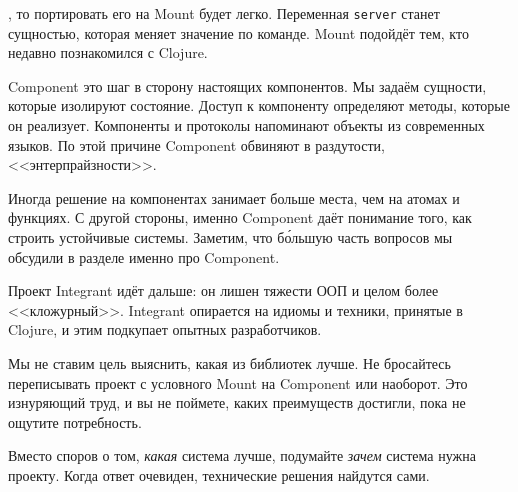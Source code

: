 \noindent
, то портировать его на Mount будет легко. Переменная \verb|server| станет
сущностью, которая меняет значение по команде. Mount подойдёт тем, кто недавно
познакомился с Clojure.

Component это шаг в сторону настоящих компонентов. Мы задаём сущности, которые
изолируют состояние. Доступ к компоненту определяют методы, которые он
реализует. Компоненты и протоколы напоминают объекты из современных языков. По
этой причине Component обвиняют в раздутости, <<энтерпрайзности>>.

Иногда решение на компонентах занимает больше места, чем на атомах и функциях. С
другой стороны, именно Component даёт понимание того, как строить устойчивые
системы. Заметим, что б\'{о}льшую часть вопросов мы обсудили в разделе именно
про Component.

Проект Integrant идёт дальше: он лишен тяжести ООП и целом более
<<кложурный>>. Integrant опирается на идиомы и техники, принятые в Clojure, и
этим подкупает опытных разработчиков.

Мы не ставим цель выяснить, какая из библиотек лучше. Не бросайтесь переписывать
проект с условного Mount на Component или наоборот. Это изнуряющий труд, и вы не
поймете, каких преимуществ достигли, пока не ощутите потребность.

Вместо споров о том, \emph{какая} система лучше, подумайте \emph{зачем} система
нужна проекту. Когда ответ очевиден, технические решения найдутся сами.
